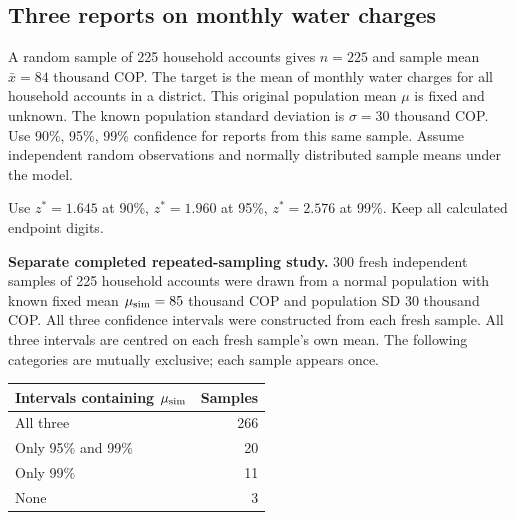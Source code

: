 \subsection{Three reports on monthly water charges}
\label{prob:c2-advanced-d}

A random sample of 225 household accounts gives $n=225$ and sample mean $\bar{x}=84$ thousand COP. The target is the mean of monthly water charges for all household accounts in a district. This original population mean $\mu$ is fixed and unknown. The known population standard deviation is $\sigma=30$ thousand COP. Use 90\%, 95\%, 99\% confidence for reports from this same sample. Assume independent random observations and normally distributed sample means under the model.

Use $z^*=1.645$ at 90\%, $z^*=1.960$ at 95\%, $z^*=2.576$ at 99\%. Keep all calculated endpoint digits.

\textbf{Separate completed repeated-sampling study.} 300 fresh independent samples of 225 household accounts were drawn from a normal population with known fixed mean $\mu_{\rm sim}=85$ thousand COP and population SD 30 thousand COP. All three confidence intervals were constructed from each fresh sample.
All three intervals are centred on each fresh sample's own mean. The following categories are mutually exclusive; each sample appears once.
\begin{center}\begin{tabular}{@{}lr@{}}\toprule
Intervals containing $\mu_{\rm sim}$ & Samples\\\midrule
All three & 266 \\[6pt]
Only 95\% and 99\% & 20 \\[6pt]
Only 99\% & 11 \\[6pt]
None & 3 \\[6pt]
\bottomrule\end{tabular}\end{center}

